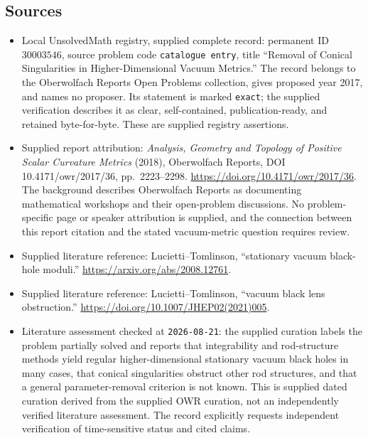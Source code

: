 \documentclass[11pt]{article}
\begin{document}
\subsection{Sources}
\begin{itemize}
\item Local UnsolvedMath registry, supplied complete record: permanent ID \(30003546\), source problem code \texttt{catalogue entry}, title ``Removal of Conical Singularities in Higher-Dimensional Vacuum Metrics.'' The record belongs to the Oberwolfach Reports Open Problems collection, gives proposed year 2017, and names no proposer. Its statement is marked \texttt{exact}; the supplied verification describes it as clear, self-contained, publication-ready, and retained byte-for-byte. These are supplied registry assertions.
\item Supplied report attribution: \emph{Analysis, Geometry and Topology of Positive Scalar Curvature Metrics} (2018), Oberwolfach Reports, DOI 10.4171/owr/2017/36, pp.\ 2223--2298. \url{https://doi.org/10.4171/owr/2017/36}. The background describes Oberwolfach Reports as documenting mathematical workshops and their open-problem discussions. No problem-specific page or speaker attribution is supplied, and the connection between this report citation and the stated vacuum-metric question requires review.
\item Supplied literature reference: Lucietti--Tomlinson, ``stationary vacuum black-hole moduli.'' \url{https://arxiv.org/abs/2008.12761}.
\item Supplied literature reference: Lucietti--Tomlinson, ``vacuum black lens obstruction.'' \url{https://doi.org/10.1007/JHEP02(2021)005}.
\item Literature assessment checked at \texttt{2026-08-21}: the supplied curation labels the problem partially solved and reports that integrability and rod-structure methods yield regular higher-dimensional stationary vacuum black holes in many cases, that conical singularities obstruct other rod structures, and that a general parameter-removal criterion is not known. This is supplied dated curation derived from the supplied OWR curation, not an independently verified literature assessment. The record explicitly requests independent verification of time-sensitive status and cited claims.
\end{itemize}
\end{document}
